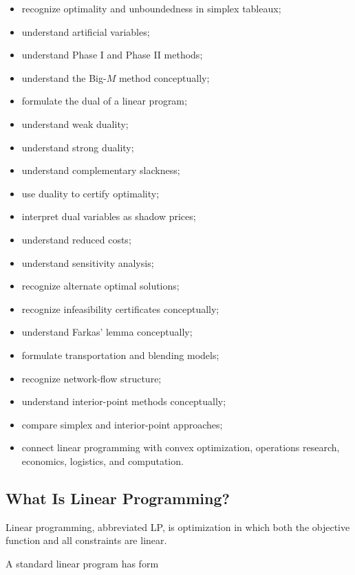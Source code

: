 {\begin{itemize}
    \item recognize optimality and unboundedness in simplex tableaux;
    \item understand artificial variables;
    \item understand Phase I and Phase II methods;
    \item understand the Big-\(M\) method conceptually;
    \item formulate the dual of a linear program;
    \item understand weak duality;
    \item understand strong duality;
    \item understand complementary slackness;
    \item use duality to certify optimality;
    \item interpret dual variables as shadow prices;
    \item understand reduced costs;
    \item understand sensitivity analysis;
    \item recognize alternate optimal solutions;
    \item recognize infeasibility certificates conceptually;
    \item understand Farkas' lemma conceptually;
    \item formulate transportation and blending models;
    \item recognize network-flow structure;
    \item understand interior-point methods conceptually;
    \item compare simplex and interior-point approaches;
    \item connect linear programming with convex optimization,
          operations research, economics, logistics, and computation.
\end{itemize}
}

\subsection{What Is Linear Programming?}
\label{subsec:what-is-linear-programming}

Linear programming, abbreviated LP, is optimization in which both the
objective function and all constraints are linear.

A standard linear program has form

